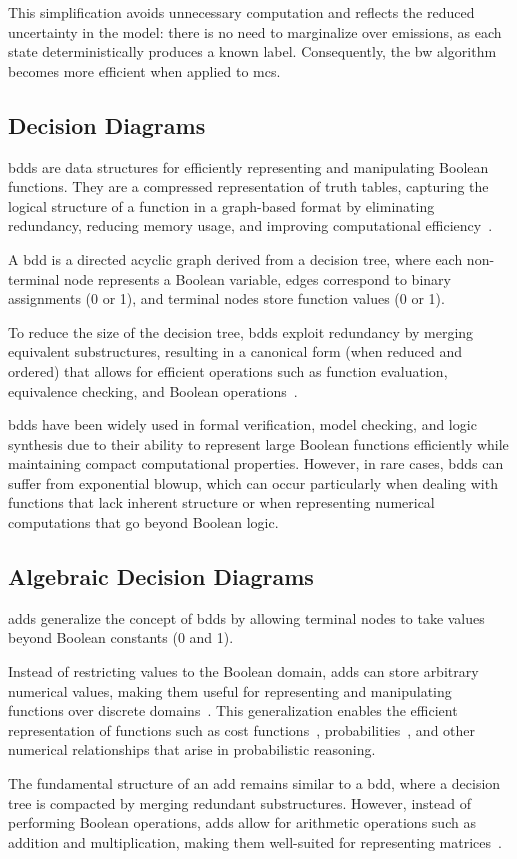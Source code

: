 This simplification avoids unnecessary computation and reflects the reduced uncertainty in the model: there is no need to marginalize over emissions, as each state deterministically produces a known label.
Consequently, the \gls{bw} algorithm becomes more efficient when applied to \glspl{mc}.

\subsection{Decision Diagrams}\label{subsec:decision-diagrams}
\glspl{bdd} are data structures for efficiently representing and manipulating Boolean functions.
They are a compressed representation of truth tables, capturing the logical structure of a function in a graph-based format by eliminating redundancy, reducing memory usage, and improving computational efficiency~\cite{bryant1986graph}.

A \gls{bdd} is a directed acyclic graph derived from a decision tree, where each non-terminal node represents a Boolean variable, edges correspond to binary assignments (0 or 1), and terminal nodes store function values (0 or 1).

To reduce the size of the decision tree, \glspl{bdd} exploit redundancy by merging equivalent substructures, resulting in a canonical form (when reduced and ordered) that allows for efficient operations such as function evaluation, equivalence checking, and Boolean operations~\cite{bryant1986graph}.

\glspl{bdd} have been widely used in formal verification, model checking, and logic synthesis due to their ability to represent large Boolean functions efficiently while maintaining compact computational properties. However, in rare cases, \glspl{bdd} can suffer from exponential blowup, which can occur particularly when dealing with functions that lack inherent structure or when representing numerical computations that go beyond Boolean logic.

\subsection{Algebraic Decision Diagrams}\label{subsec:adds}
\glspl{add} generalize the concept of \glspl{bdd} by allowing terminal nodes to take values beyond Boolean constants (0 and 1).

Instead of restricting values to the Boolean domain, \glspl{add} can store arbitrary numerical values, making them useful for representing and manipulating functions over discrete domains~\cite{bahar1997algebric}.
This generalization enables the efficient representation of functions such as cost functions~\cite{kwiatkowska2004probabilistic}, probabilities~\cite{baier1997symbolic}, and other numerical relationships that arise in probabilistic reasoning.

The fundamental structure of an \gls{add} remains similar to a \gls{bdd}, where a decision tree is compacted by merging redundant substructures.
However, instead of performing Boolean operations, \glspl{add} allow for arithmetic operations such as addition and multiplication, making them well-suited for representing matrices~\cite{bahar1997algebric}.